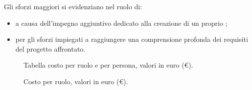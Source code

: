 Gli sforzi maggiori si evidenziano nel ruolo di:
\begin{itemize}
\item {\AMx} a causa dell'impegno aggiuntivo dedicato alla creazione di un proprio ;
\item {\ANx} per gli sforzi impiegati a raggiungere una comprensione profonda dei requisiti del progetto affrontato.
\end{itemize}

\begin{figure}[H]
\label{tab:car}

  \caption{Tabella costo {\AR} per ruolo e per persona, valori in euro (\euro).}
\end{figure}

\begin{figure}[H]
\caption{Costo {\AR} per ruolo, valori in euro (\euro).}
\label{fig:car}
\end{figure}



